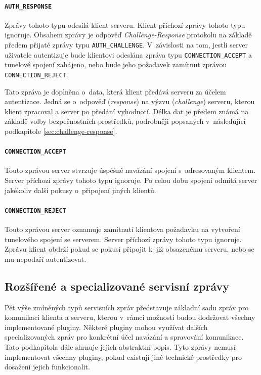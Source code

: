 \documentclass[thesis=M,czech]{FITthesis}[2012/10/20]
\begin{document}
  \paragraph{\texttt{AUTH\_RESPONSE}}
  
    Zprávy tohoto typu odesílá klient serveru. Klient příchozí zprávy tohoto typu ignoruje. Obsahem zprávy je odpověď \textit{Challenge-Response} protokolu na základě předem přijaté zprávy typu \texttt{AUTH\_CHALLENGE}. V~závislosti na tom, jestli server uživatele autentizuje bude klientovi odeslána zpráva typu \texttt{CONNECTION\_ACCEPT} a tunelové spojení zahájeno, nebo bude jeho požadavek zamítnut zprávou \texttt{CONNECTION\_REJECT}.
    
    Tato zpráva je doplněna o~data, která klient předává serveru za účelem autentizace. Jedná se o~odpověď (\textit{response}) na výzvu (\textit{challenge}) serveru, kterou klient zpracoval a server po předání vyhodnotí. Délka dat je předem známá na základě volby bezpečnostních prostředků, podrobněji popsaných v~následující podkapitole \ref{sec:challenge-response}.
    
  \paragraph{\texttt{CONNECTION\_ACCEPT}}
  
    Touto zprávou server stvrzuje úspěšné navázání spojení s~adresovaným klientem. Server příchozí zprávy tohoto typu ignoruje. Po celou dobu spojení odmítá server jakékoliv další pokusy o~připojení jiných klientů.
    
  \paragraph{\texttt{CONNECTION\_REJECT}}
    
    Touto zprávou server oznamuje zamítnutí klientova požadavku na vytvoření tunelového spojení se serverem. Server příchozí zprávy tohoto typu ignoruje. Zprávu klient obdrží pokud se pokusí připojit k~již obsazenému serveru, nebo se mu nepodaří autentizovat.
    

\subsection{Rozšířené a specializované servisní zprávy}
    
Pět výše zmíněných typů servisních zpráv představuje základní sadu zpráv pro komunikaci klienta a serveru, kterou v~rámci možností budou dodržovat všechny implementované pluginy. Některé pluginy mohou využívat dalších specializovaných zpráv pro konkrétní účel navázání a spravování komunikace. Tato podkapitola dále shrnuje jejich abstraktní popis. Tyto zprávy nemusí implementovat všechny pluginy, pokud existují jiné technické prostředky pro dosažení jejich funkcionalit.
\end{document}
